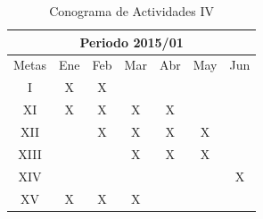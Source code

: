 \begin{table}[h]
\centering
%

\begin{tabular}{|c|c|c|c|c|c|c|}
\hline
\multicolumn{7}{|c|}{Periodo 2015/01}\tabularnewline
\hline
\hline
Metas & Ene & Feb & Mar & Abr & May & Jun\tabularnewline
\hline
I & X & X &  &  &  & \tabularnewline
\hline
XI & X & X & X & X &  & \tabularnewline
\hline
XII &  & X & X & X & X & \tabularnewline
\hline
XIII &  &  & X & X & X & \tabularnewline
\hline
XIV &  &  &  &  &  & X\tabularnewline
\hline
XV & X & X & X &  &  & \tabularnewline
\hline
\end{tabular}
%

\caption{Conograma de Actividades IV}
\label{reglasIV}
\end{table}%




